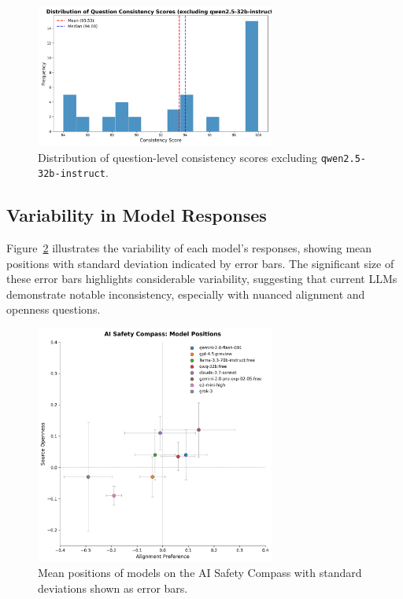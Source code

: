 \begin{figure}[htbp]
    \centering
    \includegraphics[width=0.7\textwidth]{figures/histogram_question_consistency_excluding_qwen2.5-32b-instruct.png}
    \caption{Distribution of question-level consistency scores excluding \texttt{qwen2.5-32b-instruct}.}
    \label{fig:question_consistency_histogram_exclude_qwen}
\end{figure}

\subsection{Variability in Model Responses}

Figure~\ref{fig:compass_variance} illustrates the variability of each model's responses, showing mean positions with standard deviation indicated by error bars. The significant size of these error bars highlights considerable variability, suggesting that current LLMs demonstrate notable inconsistency, especially with nuanced alignment and openness questions.

\begin{figure}[htbp]
    \centering
    \includegraphics[width=0.7\textwidth]{figures/compass_with_error_bars.png}
    \caption{Mean positions of models on the AI Safety Compass with standard deviations shown as error bars.}
    \label{fig:compass_variance}
\end{figure}

